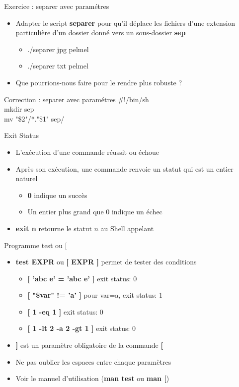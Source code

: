 \documentclass[xcolor=table]{beamer}
\begin{document}
\begin{frame}{Exercice : separer avec paramétres}
\begin{itemize}
    \item Adapter le script \textbf{separer} pour qu'il déplace les fichiers d'une extension particulière d'un dossier donné vers un sous-dossier \textbf{sep}
    \begin{itemize}
        \item ./separer jpg pelmel
        \item ./separer txt pelmel
    \end{itemize}
    \item Que pourrions-nous faire pour le rendre plus robuste ?
\end{itemize}
\end{frame}

\begin{frame}{Correction : separer avec paramétres}
\#!/bin/sh\\
mkdir sep\\
mv "\$2"/*."\$1" sep/
\end{frame}

\begin{frame}{Exit Status}
\begin{itemize}
    \item L'exécution d'une commande réussit ou échoue
    \item Après son exécution, une commande renvoie un statut qui est un entier naturel
    \begin{itemize}
        \item \textbf{0} indique un succès
        \item Un entier plus grand que 0 indique un échec
    \end{itemize}
    \item \textbf{exit n} retourne le statut $n$ au Shell appelant
\end{itemize}
\end{frame}

\begin{frame}{Programme test ou [}
\begin{itemize}
    \item \textbf{test EXPR} ou \textbf{[ EXPR ]} permet de tester des conditions
    \begin{itemize}
        \item \textbf{[ 'abc e' = 'abc e' ]} \quad exit status: 0
        \item \textbf{[ "\$var" != 'a' ]} \quad pour var=a, exit status: 1
        \item \textbf{[ 1 -eq 1 ]} \quad exit status: 0
        \item \textbf{[ 1 -lt 2 -a 2 -gt 1 ]} \quad exit status: 0
    \end{itemize}
    \item \textbf{]} est un paramètre obligatoire de la commande \textbf{[}
    \item Ne pas oublier les espaces entre chaque paramètres
    \item Voir le manuel d'utilisation (\textbf{man test} ou \textbf{man [})
\end{itemize}
\end{frame}
\end{document}
